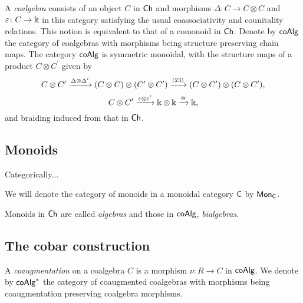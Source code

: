 A \textit{coalgebra} consists of an object $C$ in $\mathsf{Ch}$ and morphisms $\Delta \colon C \to C \otimes C$ and $\varepsilon \colon C \to \Bbbk$ in this category satisfying the usual coassociativity and counitality relations. 
This notion is equivalent to that of a comonoid in $\mathsf{Ch}$.
Denote by $\mathsf{coAlg}$ the category of coalgebras with morphisms being structure preserving chain maps.
The category $\mathsf{coAlg}$ is symmetric monoidal, with the structure maps of a product $C \otimes C^\prime$ given by
\begin{equation} \label{e:coalgebras are symmetric monoidal1}
C \otimes C^\prime \xrightarrow{\Delta \otimes \Delta^\prime}
(C \otimes C) \otimes (C^\prime \otimes C^\prime) \xrightarrow{(23)}
(C \otimes C^\prime) \otimes (C \otimes C^\prime),
\end{equation}
\begin{equation} \label{e:coalgebras are symmetric monoidal2}
C \otimes C^\prime \xrightarrow{\varepsilon \otimes \varepsilon^\prime}
\Bbbk \otimes \Bbbk \xrightarrow{\cong}
\Bbbk,
\end{equation}
and braiding induced from that in $\mathsf{Ch}$.

\subsection{Monoids}


Categorically...

We will denote the category of monoids in a monoidal category $\mathsf{C}$ by $\mathsf{Mon}_{\mathsf{C}}$.

Monoids in $\mathsf{Ch}$ are called \textit{algebras} and those in $\mathsf{coAlg}$, \textit{bialgebras}.

\subsection{The cobar construction}

A \textit{coaugmentation} on a coalgebra $C$ is a morphism $\nu \colon R \to C$ in $\mathsf{coAlg}$.
We denote by $\mathsf{coAlg}^*$ the category of coaugmented coalgebras with morphisms being coaugmentation preserving coalgebra morphisms.


